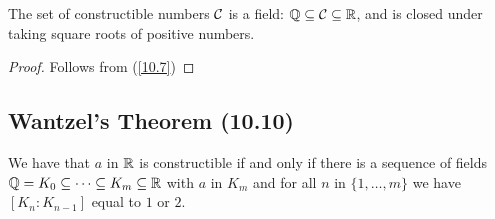 The set of constructible numbers $\mathcal{C}$ is a field: $\mathbb{Q} \subseteq \mathcal{C} \subseteq \mathbb{R}$,
and is closed under taking square roots of positive numbers.

\begin{proof}
    Follows from (\ref{10.7})
\end{proof}

\newpage

\subsection{Wantzel's Theorem (10.10)} \label{10.10}

We have that $a$ in $\mathbb{R}$ is constructible if and only if there is a sequence of fields
$\mathbb{Q} = K_0 \subseteq \cdots \subseteq K_m \subseteq \mathbb{R}$ with $a$ in $K_m$ and
for all $n$ in $\{1, \ldots, m\}$ we have $[K_n : K_{n - 1}]$ equal to $1$ or $2$.

